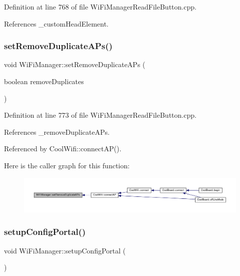 Definition at line 768 of file Wi\+Fi\+Manager\+Read\+File\+Button.\+cpp.



References \+\_\+custom\+Head\+Element.

\mbox{\label{class_wi_fi_manager_a4dd1dbf4f22900f226a3897b88155212}} 
\subsubsection{\texorpdfstring{set\+Remove\+Duplicate\+A\+Ps()}{setRemoveDuplicateAPs()}}
{\footnotesize\ttfamily void Wi\+Fi\+Manager\+::set\+Remove\+Duplicate\+A\+Ps (\begin{DoxyParamCaption}\item[{boolean}]{remove\+Duplicates }\end{DoxyParamCaption})}



Definition at line 773 of file Wi\+Fi\+Manager\+Read\+File\+Button.\+cpp.



References \+\_\+remove\+Duplicate\+A\+Ps.



Referenced by Cool\+Wifi\+::connect\+A\+P().

Here is the caller graph for this function\+:
\nopagebreak
\begin{figure}[H]
\begin{center}
\leavevmode
\includegraphics[width=350pt]{d4/dc8/class_wi_fi_manager_a4dd1dbf4f22900f226a3897b88155212_icgraph}
\end{center}
\end{figure}
\mbox{\label{class_wi_fi_manager_a1743325d0dd86d011df96b22d2a0ddd6}} 
\subsubsection{\texorpdfstring{setup\+Config\+Portal()}{setupConfigPortal()}}
{\footnotesize\ttfamily void Wi\+Fi\+Manager\+::setup\+Config\+Portal (\begin{DoxyParamCaption}{ }\end{DoxyParamCaption})\hspace{0.3cm}{\ttfamily [private]}}



